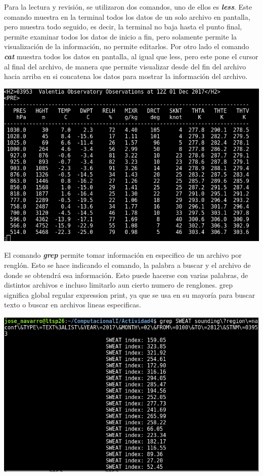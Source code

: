 \documentclass[12pt]{article}
\begin{document}
Para la lectura y revisión, se utilizaron dos comandos, uno de ellos es  \textbf{\textit{less}}. Este comando muestra en la terminal todos los datos de un solo archivo en pantalla, pero muestra todo seguido, es decir, la terminal no baja hasta el punto final, permite examinar todos los datos de inicio a fin, pero solamente permite la visualización de la información, no permite editarlos. Por otro lado el comando  \textbf{\textit{cat}} muestra todos los datos en pantalla, al igual que less, pero este pone el cursor al final del archivo, de manera que permite visualizar desde del fin del archivo hacia arriba en si concatena los datos para mostrar la información del archivo. \\

\begin{center}
\includegraphics[scale=0.55]{less.png}
\end{center} 

El comando  \textbf{\textit{grep}} permite tomar información en especifico de un archivo por renglón. Esto se hace indicando el comando, la palabra a buscar y el archivo de donde se obtendrá esa información. Esto puede hacerse con varias palabras, de distintos archivos e incluso limitarlo aun cierto numero de renglones. grep significa global regular expression print, ya que se usa en su mayoría para buscar texto o buscar en archivos lineas especificas. \\

\begin{center}
\includegraphics[scale=0.55]{grep.png}
\end{center} 
\end{document}
